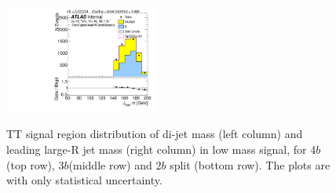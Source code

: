 \begin{figure}[htbp!]
\begin{center}
\includegraphics[angle=270, width=0.45\textwidth]{./figures/boosted/TT/Moriond_TT_TwoTag_split_Signal_leadHCand_Mass_s.pdf}\\
\end{center}
\caption{TT signal region distribution of di-jet mass (left column) and leading large-R jet mass (right column) in low mass signal, for 4$b$ (top row), 3$b$(middle row) and 2$b$ split (bottom row). The plots are with only statistical uncertainty.}
\label{CRSB:TTSR_Distribution}
\end{figure}
